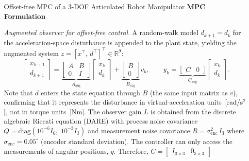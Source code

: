 \begin{examplebox}{Offset-free MPC of a 3-DOF Articulated Robot Manipulator}
	\vspace{0.4em}
	\textbf{\textsf{MPC Formulation}}
	
	\emph{Augmented observer for offset-free control.}
	A random-walk model $d_{k+1} = d_k$ for the acceleration-space disturbance
	is appended to the plant state,
	yielding the augmented system $z = [x^{\top},\,d^{\top}]^{\top} \in \mathbb{R}^{9}$:
	\begin{equation*}
		\begin{bmatrix}x_{k+1}\\d_{k+1}\end{bmatrix}
		=
		\underbrace{\begin{bmatrix}A & B \\ 0 & I\end{bmatrix}}_{A_{\mathrm{aug}}}
		\begin{bmatrix}x_k\\d_k\end{bmatrix}
		+
		\underbrace{\begin{bmatrix}B\\0\end{bmatrix}}_{B_{\mathrm{aug}}}v_k, \qquad
		y_k =
		\underbrace{\begin{bmatrix}C & 0\end{bmatrix}}_{C_{\mathrm{aug}}}
		\begin{bmatrix}x_k\\d_k\end{bmatrix}.
	\end{equation*}
	Note that $d$ enters the state equation through $B$ (the same input matrix as $v$),
	confirming that it represents the disturbance in virtual-acceleration
	units~[rad/s$^{2}$], not in torque units~[Nm].
	The observer gain $L$ is obtained from the discrete algebraic Riccati equation
	(DARE) with process noise covariance
	$Q = \mathrm{diag}(10^{-6}I_6,\;10^{-3}I_3)$ and measurement noise
	covariance $R = \sigma_{\mathrm{enc}}^{2}\,I_3$ where
	$\sigma_{\mathrm{enc}} = 0.05^{\circ}$ (encoder standard deviation). The controller can only access the measurements of angular positions, $q$. Therefore, $C=\begin{bmatrix}
	I_{3\times 3} & 0_{3\times 3}
	\end{bmatrix}$
	

\end{examplebox}
